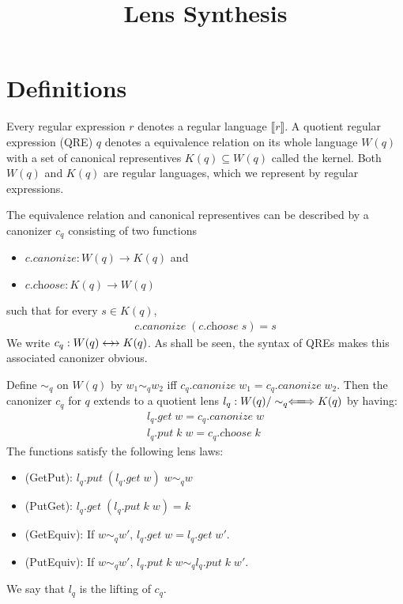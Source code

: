 \documentclass[a4paper,11pt] {article}
\theoremstyle{plain}
\newcommand{\negjoinrel}{\mathrel{\mkern3mu}}
\newcommand{\rlaprel}[1]{\mathrel{\mathrlap{#1}}}
\newcommand{\lget}[1]{\textit{$#1$.get}}
\newcommand{\lput}[1]{\textit{$#1$.put}}
\newcommand{\lcreate}[1]{\textit{$#1$.create}}
\newcommand{\lcanonize}[1]{\textit{$#1$.canonize}}
\newcommand{\lchoose}[1]{\textit{$#1$.choose}}
\newcommand{\canon}{\rlaprel{\longleftarrow}\rlaprel{\longrightarrow}
  \negjoinrel\rightarrow\;\,}
\newcommand{\lensbetween}[1]{\xLongleftrightarrow{#1}}
\newcommand{\name}[1]{\textsf{#1}}
\begin{document}
\title{Lens Synthesis}
\date{}
\maketitle



\section{Definitions}
\label{sec:definitions}
Every regular expression $r$ denotes a regular language $\llbracket r \rrbracket$.
A quotient regular expression (QRE) $q$ denotes a equivalence relation
on its whole language $W(q)$ with a set of canonical representives
$K(q) \subseteq W(q)$ called the kernel.
Both $W(q)$ and $K(q)$ are regular
languages, which we represent by regular expressions.

The equivalence relation and canonical representives 
can be described by a canonizer $c_q$
consisting of two functions
\begin{itemize}
\item $\lcanonize{c}: W(q) \to K(q)$ and
\item $\lchoose{c}: K(q) \to W(q)$
\end{itemize}
such that for every $s \in K(q)$,
\begin{align*}
  \lcanonize{c} \; (\lchoose{c} \; s) = s
\end{align*}
We write $c_q: W(q) \canon K(q)$.
As shall be seen, the syntax of QREs makes this associated canonizer obvious.

Define $\sim_q$ on $W(q)$ by $w_1 \sim_q w_2$ iff
$\lcanonize{c_q} \; w_1 = \lcanonize{c_q} \; w_2$.
Then the canonizer $c_q$ for $q$ extends to a quotient lens
$l_q: W(q)/\sim_q \lensbetween{} K(q)$ by having:
\begin{gather*}
  \lget{l_q} \; w = \lcanonize{c_q} \; w\\
  \lput{l_q} \; k \; w = \lchoose{c_q} \; k 
\end{gather*}
The functions satisfy the following lens laws:
\begin{itemize}
\item (\name{GetPut}): $\lput{l_q} \; (\lget{l_q} \; w) \; w \sim_q w$ 
\item (\name{PutGet}): $\lget{l_q} \; (\lput{l_q} \; k \; w) = k$
\item (\name{GetEquiv}): If $w \sim_q w'$,
  $\lget{l_q} \; w = \lget{l_q} \; w'$.
\item (\name{PutEquiv}): If $w \sim_q w'$,
  $\lput{l_q} \; k \; w \sim_q \lput{l_q} \; k \; w'$.
\end{itemize}
We say that $l_q$ is the lifting of $c_q$.
\end{document}
